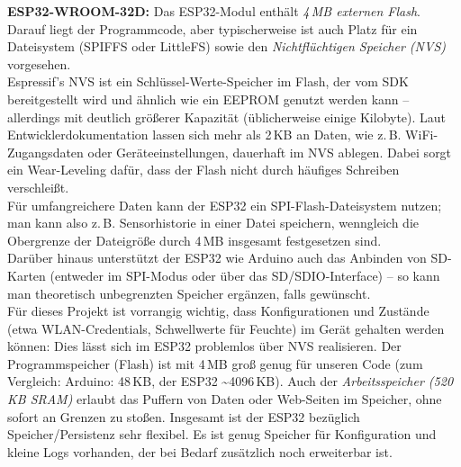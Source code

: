 \noindent\textbf{ESP32-WROOM-32D:} Das ESP32-Modul enthält \textit{4\,MB externen Flash}. \autocite{esp32_comparison} Darauf liegt der Programmcode, aber typischerweise ist auch Platz für ein Dateisystem (SPIFFS oder LittleFS) sowie den \textit{Nichtflüchtigen Speicher (NVS)} vorgesehen. 
\\
Espressif’s NVS ist ein Schlüssel-Werte-Speicher im Flash, der vom SDK bereitgestellt wird und ähnlich wie ein EEPROM genutzt werden kann – allerdings mit deutlich größerer Kapazität (üblicherweise einige Kilobyte). Laut Entwicklerdokumentation lassen sich mehr als 2\,KB an Daten, wie z.\,B. WiFi-Zugangsdaten oder Geräteeinstellungen, dauerhaft im NVS ablegen. \autocite{esp_nvs} Dabei sorgt ein Wear-Leveling dafür, dass der Flash nicht durch häufiges Schreiben verschleißt. 
\\Für umfangreichere Daten kann der ESP32 ein SPI-Flash-Dateisystem nutzen; man kann also z.\,B. Sensorhistorie in einer Datei speichern, wenngleich die Obergrenze der Dateigröße durch 4\,MB insgesamt festgesetzen sind. 
\\
Darüber hinaus unterstützt der ESP32 wie Arduino auch das Anbinden von SD-Karten (entweder im SPI-Modus oder über das SD/SDIO-Interface) – so kann man theoretisch unbegrenzten Speicher ergänzen, falls gewünscht. 
\\Für dieses Projekt ist vorrangig wichtig, dass Konfigurationen und Zustände (etwa WLAN-Credentials, Schwellwerte für Feuchte) im Gerät gehalten werden können: Dies lässt sich im ESP32 problemlos über NVS realisieren. \autocite{esp_nvs} Der Programmspeicher (Flash) ist mit 4\,MB groß genug für unseren Code (zum Vergleich: Arduino: 48\,KB, der ESP32 \textasciitilde4096\,KB). Auch der \textit{Arbeitsspeicher (520\,KB SRAM)} erlaubt das Puffern von Daten oder Web-Seiten im Speicher, ohne sofort an Grenzen zu stoßen. Insgesamt ist der ESP32 bezüglich Speicher/Persistenz sehr flexibel. Es ist genug Speicher für Konfiguration und kleine Logs vorhanden, der bei Bedarf zusätzlich noch erweiterbar ist.


\vspace{5mm}

